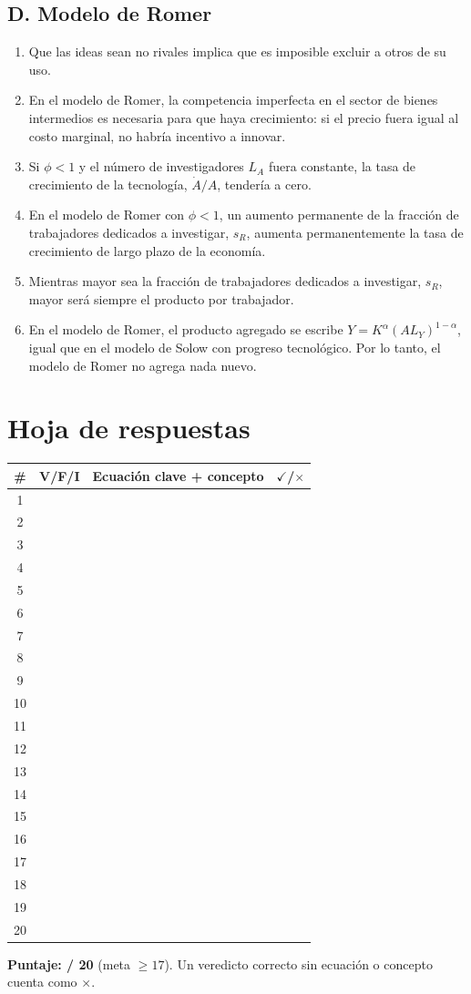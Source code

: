 \documentclass[11pt,letterpaper]{article}
\begin{document}
\subsection*{D. Modelo de Romer}
\begin{enumerate}[resume=comentes]
  \item Que las ideas sean no rivales implica que es imposible excluir a otros de su uso.
  \item En el modelo de Romer, la competencia imperfecta en el sector de bienes intermedios es necesaria
  para que haya crecimiento: si el precio fuera igual al costo marginal, no habría incentivo a innovar.
  \item Si $\phi < 1$ y el número de investigadores $L_A$ fuera constante, la tasa de crecimiento de la tecnología,
  $\dot{A}/A$, tendería a cero.
  \item En el modelo de Romer con $\phi < 1$, un aumento permanente de la fracción de trabajadores dedicados
  a investigar, $s_R$, aumenta permanentemente la tasa de crecimiento de largo plazo de la economía.
  \item Mientras mayor sea la fracción de trabajadores dedicados a investigar, $s_R$, mayor será siempre el
  producto por trabajador.
  \item En el modelo de Romer, el producto agregado se escribe $Y = K^{\alpha}(AL_Y)^{1-\alpha}$, igual que en el modelo
  de Solow con progreso tecnológico. Por lo tanto, el modelo de Romer no agrega nada nuevo.
\end{enumerate}

\newpage
\section*{Hoja de respuestas}
\renewcommand{\arraystretch}{1.9}
\begin{tabular}{|c|c|p{10.6cm}|c|}
  \hline
  \textbf{\#} & \textbf{V/F/I} & \textbf{Ecuación clave + concepto} & \textbf{$\checkmark$/$\times$} \\ \hline
  1 & & & \\ \hline
  2 & & & \\ \hline
  3 & & & \\ \hline
  4 & & & \\ \hline
  5 & & & \\ \hline
  6 & & & \\ \hline
  7 & & & \\ \hline
  8 & & & \\ \hline
  9 & & & \\ \hline
  10 & & & \\ \hline
  11 & & & \\ \hline
  12 & & & \\ \hline
  13 & & & \\ \hline
  14 & & & \\ \hline
  15 & & & \\ \hline
  16 & & & \\ \hline
  17 & & & \\ \hline
  18 & & & \\ \hline
  19 & & & \\ \hline
  20 & & & \\ \hline
\end{tabular}

\bigskip
\textbf{Puntaje: \underline{\hspace{1.5cm}} / 20} \quad (meta $\ge 17$). Un veredicto correcto sin ecuación o concepto cuenta como $\times$.
\end{document}
